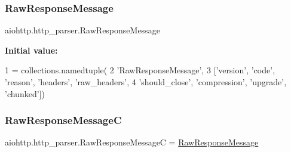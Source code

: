 \mbox{\label{namespaceaiohttp_1_1http__parser_a9963bd217f7dd3de0c17e121b8b0d4fa}} 
\subsubsection{\texorpdfstring{Raw\+Response\+Message}{RawResponseMessage}}
{\footnotesize\ttfamily aiohttp.\+http\+\_\+parser.\+Raw\+Response\+Message}

{\bfseries Initial value\+:}
\begin{DoxyCode}
1 =  collections.namedtuple(
2     \textcolor{stringliteral}{'RawResponseMessage'},
3     [\textcolor{stringliteral}{'version'}, \textcolor{stringliteral}{'code'}, \textcolor{stringliteral}{'reason'}, \textcolor{stringliteral}{'headers'}, \textcolor{stringliteral}{'raw\_headers'},
4      \textcolor{stringliteral}{'should\_close'}, \textcolor{stringliteral}{'compression'}, \textcolor{stringliteral}{'upgrade'}, \textcolor{stringliteral}{'chunked'}])
\end{DoxyCode}
\mbox{\label{namespaceaiohttp_1_1http__parser_ab93f5698e1ece0a0fa957ea89ed37556}} 
\subsubsection{\texorpdfstring{Raw\+Response\+MessageC}{RawResponseMessageC}}
{\footnotesize\ttfamily aiohttp.\+http\+\_\+parser.\+Raw\+Response\+MessageC = \hyperlink{namespaceaiohttp_1_1http__parser_a9963bd217f7dd3de0c17e121b8b0d4fa}{Raw\+Response\+Message}}

\mbox{\label{namespaceaiohttp_1_1http__parser_a2383bb15d297b953d96e4dba2801c1e0}} 
